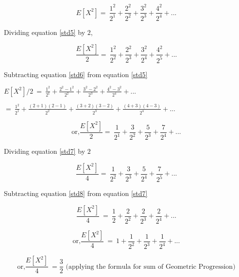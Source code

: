 \documentclass{book}
\begin{document}
\begin{equation}\label{std5}
E[X^2]=\ \frac{1^2}{2^1} + \frac{2^2}{2^2} + \frac{3^2}{2^3} + \frac{4^2}{2^4} + ...
\end{equation}

Dividing equation \ref{std5} by $2$,

\begin{equation}\label{std6}
\frac{E[X^2]}{2}=\ \frac{1^2}{2^2} + \frac{2^2}{2^3} + \frac{3^2}{2^4} + \frac{4^2}{2^5} + ...
\end{equation}

Subtracting equation \ref{std6} from equation \ref{std5}\\

\begin{center}
   $E[X^2]/2\ =\ \frac{1^2}{2^1} + \frac{2^2-1^2}{2^2} + \frac{3^2-2^2}{2^3} + \frac{4^2-3^2}{2^4} + ...$ 
   \end{center}   


\begin{center}
    $=\ \frac{1^2}{2^1} + \frac{(2+1)(2-1)}{2^2} + \frac{(3+2)(3-2)}{2^3} + \frac{(4+3)(4-3)}{2^4} + ... $
    \end{center}    

\begin{equation}\label{std7}
\text{or,} \frac{E[X^2]}{2}=\ \frac{1}{2^1} + \frac{3}{2^2} + \frac{5}{2^3} + \frac{7}{2^4} + ...
\end{equation}
	

Dividing equation \ref{std7} by $2$

\begin{equation}\label{std8}
\frac{E[X^2]}{4}=\ \frac{1}{2^2} + \frac{3}{2^3} + \frac{5}{2^4} + \frac{7}{2^5} + ...
\end{equation}

 
 Subtracting equation \ref{std8} from equation \ref{std7}
 
\begin{equation}
\frac{E[X^2]}{4}\ =\ \frac{1}{2} + \frac{2}{2^2} + \frac{2}{2^3} + \frac{2}{2^4} + ...
\end{equation}

\begin{equation}
\text{or,} \frac{E[X^2]}{4}\ =\ 1 + \frac{1}{2^2} + \frac{1}{2^3} + \frac{1}{2^4} + ... 
\end{equation}

\begin{equation}
\text{or,} \frac{E[X^2]}{4}\ =\frac{3}{2} \text{ (applying the formula for sum of Geometric Progression)}
\end{equation}
\end{document}
